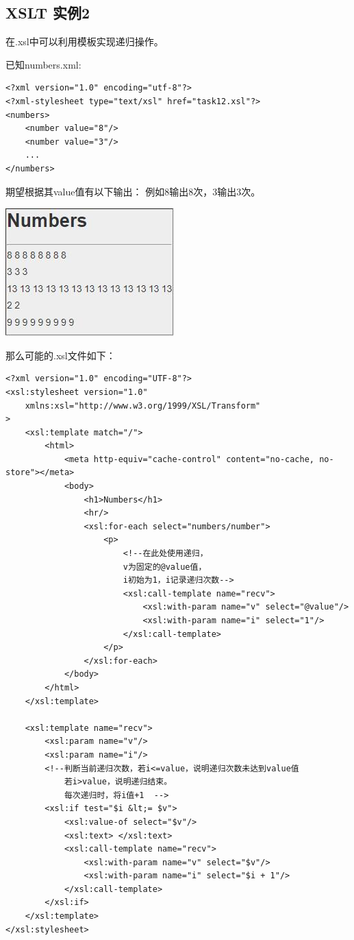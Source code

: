 \documentclass[fontset=windows]{article}
\begin{document}
\subsection{XSLT 实例2}

在.xsl中可以利用模板实现递归操作。

已知numbers.xml:

\begin{verbatim}
<?xml version="1.0" encoding="utf-8"?>
<?xml-stylesheet type="text/xsl" href="task12.xsl"?>
<numbers>
	<number value="8"/>
	<number value="3"/>
	...
</numbers>
\end{verbatim}

期望根据其value值有以下输出：
例如8输出8次，3输出3次。

\begin{center}
\includegraphics[scale=0.8]{3.jpg}
\end{center}

那么可能的.xsl文件如下：
\begin{verbatim}
<?xml version="1.0" encoding="UTF-8"?>
<xsl:stylesheet version="1.0"
    xmlns:xsl="http://www.w3.org/1999/XSL/Transform"
>
	<xsl:template match="/">
		<html>
			<meta http-equiv="cache-control" content="no-cache, no-store"></meta>
			<body>
				<h1>Numbers</h1>
				<hr/>
				<xsl:for-each select="numbers/number">
					<p>
						<!--在此处使用递归，
						v为固定的@value值，
						i初始为1，i记录递归次数-->
						<xsl:call-template name="recv">
							<xsl:with-param name="v" select="@value"/>
							<xsl:with-param name="i" select="1"/>
						</xsl:call-template>
					</p>
				</xsl:for-each>
			</body>
		</html>
	</xsl:template>

	<xsl:template name="recv">
		<xsl:param name="v"/>
		<xsl:param name="i"/>
		<!--判断当前递归次数，若i<=value，说明递归次数未达到value值
			若i>value，说明递归结束。
			每次递归时，将i值+1  -->
		<xsl:if test="$i &lt;= $v">
			<xsl:value-of select="$v"/>
			<xsl:text> </xsl:text>
			<xsl:call-template name="recv">
				<xsl:with-param name="v" select="$v"/>
				<xsl:with-param name="i" select="$i + 1"/>
			</xsl:call-template>
		</xsl:if>
	</xsl:template>
</xsl:stylesheet>
\end{verbatim}
\end{document}
